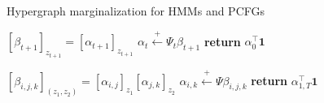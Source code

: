 \documentclass{article}
\begin{document}
\begin{algorithm}[t]
\caption{Hypergraph marginalization for HMMs and PCFGs}
\label{fig:marg-hmm-pcfg}
\begin{minipage}[t]{0.45\textwidth}
\begin{algorithmic}
\STATE $[\beta_{t+1}]_{z_{t+1}} = [\alpha_{t+1}]_{z_{t+1}}$
\ENDFOR
\STATE $\alpha_t \stackrel{+}{\gets} \Psi_t \beta_{t+1}$
\ENDFOR
\STATE \textbf{return} $\alpha_0^\top \mathbf{1}$
\end{algorithmic}
\end{minipage}
\vspace{0pt}
\begin{minipage}[t]{0.50\textwidth}
\begin{algorithmic} 
\STATE $[\beta_{i,j,k}]_{(z_1,z_2)} = [\alpha_{i,j}]_{z_1}[\alpha_{j,k}]_{z_2}$
\ENDFOR
\STATE $\alpha_{i,k} \stackrel{+}{\gets} \Psi\beta_{i,j,k}$
\ENDFOR
\STATE \textbf{return} $\alpha_{1,T}^\top \mathbf{1}$
\end{algorithmic}
\end{minipage}
\end{algorithm}

\end{document}
